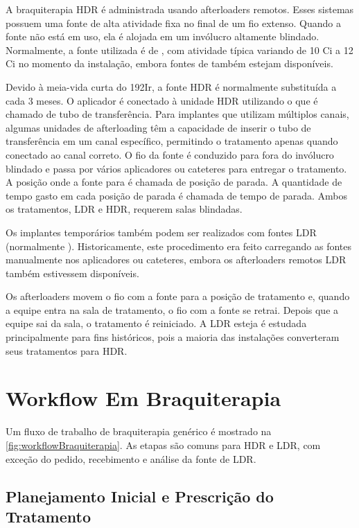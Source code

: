 \documentclass[11pt,a4paper]{article}
\begin{document}
	A braquiterapia HDR é administrada usando afterloaders remotos. Esses sistemas possuem uma fonte de alta atividade fixa no final de um fio extenso. Quando a fonte não está em uso, ela é alojada em um invólucro altamente blindado. Normalmente, a fonte utilizada é de , com atividade típica variando de 10 Ci a 12 Ci no momento da instalação, embora fontes de  também estejam disponíveis. 
	
	
	Devido à meia-vida curta do 192Ir, a fonte HDR é normalmente substituída a cada 3 meses. O aplicador é conectado à unidade HDR utilizando o que é chamado de tubo de transferência. Para implantes que utilizam múltiplos canais, algumas unidades de afterloading têm a capacidade de inserir o tubo de transferência em um canal específico, permitindo o tratamento apenas quando conectado ao canal correto. O fio da fonte é conduzido para fora do invólucro blindado e passa por vários aplicadores ou cateteres para entregar o tratamento. A posição onde a fonte para é chamada de posição de parada. A quantidade de tempo gasto em cada posição de parada é chamada de tempo de parada. Ambos os tratamentos, LDR e HDR, requerem salas blindadas.

	Os implantes temporários também podem ser realizados com fontes LDR (normalmente ). Historicamente, este procedimento era feito carregando as fontes manualmente nos aplicadores ou cateteres, embora os afterloaders remotos LDR também estivessem disponíveis. 
	
	
	Os afterloaders movem o fio com a fonte para a posição de tratamento e, quando a equipe entra na sala de tratamento, o fio com a fonte se retrai. Depois que a equipe sai da sala, o tratamento é reiniciado. A LDR esteja é estudada principalmente para fins históricos, pois a maioria das instalações converteram seus tratamentos para HDR.

\section{Workflow Em Braquiterapia}

	Um fluxo de trabalho de braquiterapia genérico é mostrado na \ref{fig:workflowBraquiterapia}. As etapas são comuns para HDR e LDR, com exceção do pedido, recebimento e análise da fonte de LDR.
	
\subsection*{Planejamento Inicial e Prescrição do Tratamento}
\end{document}
